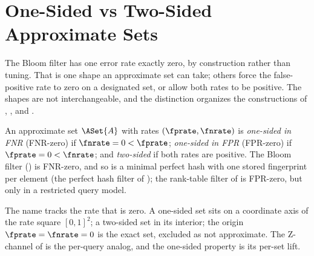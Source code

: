 %

\section{One-Sided vs Two-Sided Approximate Sets}
\label{sec:one-sided-two-sided}

The Bloom filter has one error rate exactly zero, by construction rather
than tuning. That is one shape an approximate set can take; others force
the false-positive rate to zero on a designated set, or allow both rates to
be positive. The shapes are not interchangeable, and the distinction
organizes the constructions of ,
, and .

\begin{definition}
\label{def:one-sided}
An approximate set $\ASet{A}$ with rates $(\fprate, \fnrate)$ is
\emph{one-sided in FNR} (FNR-zero) if $\fnrate = 0 < \fprate$; \emph{one-sided
in FPR} (FPR-zero) if $\fprate = 0 < \fnrate$; and \emph{two-sided} if both
rates are positive. The Bloom
filter () is FNR-zero, and so is a minimal perfect
hash with one stored fingerprint per element (the perfect hash filter of
); the rank-table filter of  is
FPR-zero, but only in a restricted query model.
\end{definition}

The name tracks the rate that is zero. A one-sided set sits on a coordinate
axis of the rate square $[0,1]^2$; a two-sided set in its interior; the
origin $\fprate = \fnrate = 0$ is the exact set, excluded as not
approximate. The Z-channel of  is the per-query analog,
and the one-sided property is its per-set lift.

